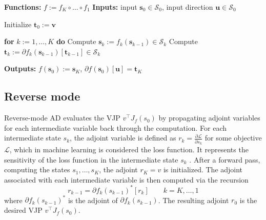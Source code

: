 \begin{algorithm}[H]
\caption{Forward-mode autodiff algorithm, from \textcite{blondel_elements_2024}}
\begin{algorithmic}[1]
    \Statex \textbf{Functions:} $f := f_K \circ \dots \circ f_1$
    \Statex \textbf{Inputs:} input $\boldsymbol{s}_0 \in \mathcal{S}_0$, input direction $\boldsymbol{u} \in \mathcal{S}_0$
    
    \State Initialize $\boldsymbol{t}_0 := \boldsymbol{v}$
    
    \State \textbf{for} $k := 1, \dots, K$ \textbf{do}
    \State \quad Compute $\boldsymbol{s}_k := f_k(\boldsymbol{s}_{k-1}) \in \mathcal{S}_k$
    \State \quad Compute $\boldsymbol{t}_k := \partial f_k(\boldsymbol{s}_{k-1})[\boldsymbol{t}_{k-1}] \in \mathcal{S}_k$
    
    \Statex \textbf{Outputs:} $f(\boldsymbol{s}_0) := \boldsymbol{s}_K$, $\partial f(\boldsymbol{s}_0)[\boldsymbol{u}] = \boldsymbol{t}_K$
\end{algorithmic}
\end{algorithm}

\subsection{Reverse mode}

Reverse-mode AD evaluates the VJP $v^\top J_f(s_0)$ by propagating adjoint variables for each intermediate variable back through the computation. For each intermediate state $s_k$, the adjoint variable is defined as $r_k = \frac{\partial \mathcal{L}}{\partial s_k}$ for some objective $\mathcal{L}$, which in machine learning is considered the loss function. It represents the sensitivity of the loss function in the intermediate state $s_k$ \parencite{baydin_automatic_2015}. After a forward pass, computing the states $s_1, \dots, s_K$, the adjoint $r_K = v$ is initialized. The adjoint associated with each intermediate variable is then computed via the recursion
\[
r_{k-1} = \partial f_k(s_{k-1})^*[r_k]
\qquad k = K,\dots, 1
\]
where $\partial f_k(s_{k-1})^*$ is the adjoint of $\partial f_k(s_{k-1})$.
The resulting adjoint $r_0$ is the desired VJP $v^\top J_f(s_0)$.


